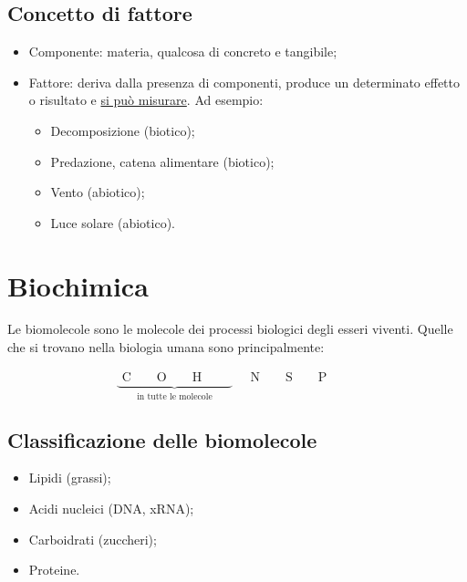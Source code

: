 \documentclass{article}
\begin{document}
\subsection{Concetto di fattore}
\begin{itemize}
    \item Componente: materia, qualcosa di concreto e tangibile;
    \item Fattore: deriva dalla presenza di componenti, produce un determinato effetto o
        risultato e \underline{si può misurare}.
        Ad esempio:
        \begin{itemize}
            \item Decomposizione (biotico);
            \item Predazione, catena alimentare (biotico);
            \item Vento (abiotico);
            \item Luce solare (abiotico).
        \end{itemize}
\end{itemize}

\newpage
\section{Biochimica}
Le biomolecole sono le molecole dei processi biologici degli esseri viventi.
Quelle che si trovano nella biologia umana sono principalmente:
\begin{center}
    \[
        \underbrace{{\begin{array}{c}
            \text{C}\qquad
            \text{O}\qquad
            \text{H}\qquad 
        \end{array}}}_{\text{in tutte le molecole}}\quad
        \begin{array}{c}
            \text{N}\qquad
            \text{S}\qquad
            \text{P}\qquad
        \end{array}
    \]
\end{center}

\subsection{Classificazione delle biomolecole}
\begin{itemize}
    \item Lipidi (grassi);
    \item Acidi nucleici (DNA, xRNA);
    \item Carboidrati (zuccheri);
    \item Proteine.
\end{itemize}
\end{document}
